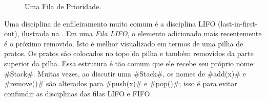 \begin{figure}
	\caption[Uma #Fila# de Prioridade]{Uma Fila de Prioridade.}
\end{figure}


Uma disciplina de enfileiramento muito comum é a disciplina LIFO
(last-in-first-out), 
%
%
%
%
ilustrada na . Em uma \emph{Fila LIFO}, o elemento adicionado mais
recentemente é o próximo removido. Isto é melhor visualizado em termos de uma
pilha de pratos. Os pratos são colocados no topo da pilha e também removidos da
parte superior da pilha. Essa estrutura é tão comum que ele recebe seu próprio
nome: #Stack#. Muitas vezes, ao discutir uma #Stack#, os nomes de #add(x)# e
#remove()# são alterados para #push(x)# e #pop()#; isso é para evitar confundir
as disciplinas das filas LIFO e FIFO.


